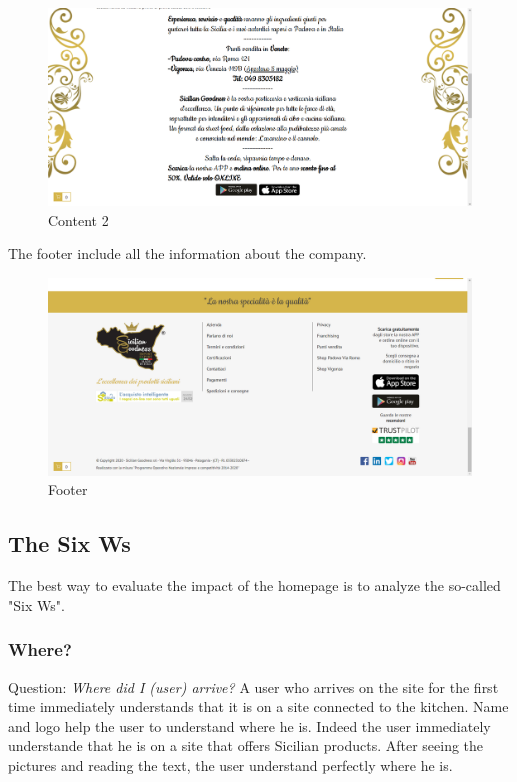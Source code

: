 \begin{figure}[H]
	\centering\includegraphics[width=12cm]{Img/content2.png}
	\caption{Content 2}
\end{figure}

The footer include all the information about the company.

\begin{figure}[H]
	\centering\includegraphics[width=12cm]{Img/contacts.png}
	\caption{Footer}
\end{figure}


\subsection{The Six Ws}
The best way to evaluate the impact of the homepage is to analyze the so-called "Six Ws".

\subsubsection{Where?}

Question: \textit{Where did I (user) arrive?}
\newline
A user who arrives on the site for the first time immediately understands that it is on a site connected to the kitchen. Name and logo help the user to understand where he is. Indeed the user immediately understande that he is on a site that offers Sicilian products. After seeing the pictures and reading the text, the user understand perfectly where he is.

